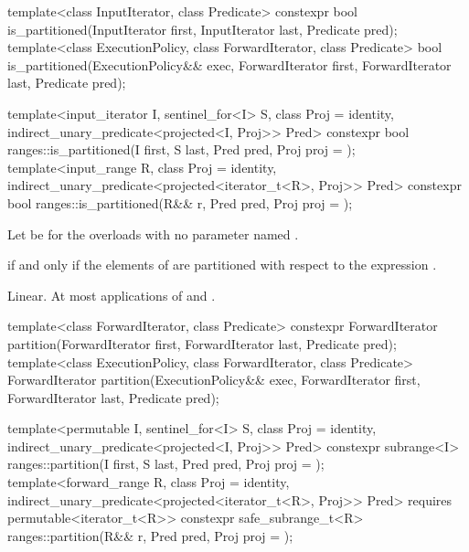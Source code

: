 %
\begin{itemdecl}
template<class InputIterator, class Predicate>
  constexpr bool is_partitioned(InputIterator first, InputIterator last, Predicate pred);
template<class ExecutionPolicy, class ForwardIterator, class Predicate>
  bool is_partitioned(ExecutionPolicy&& exec,
                      ForwardIterator first, ForwardIterator last, Predicate pred);

template<input_iterator I, sentinel_for<I> S, class Proj = identity,
         indirect_unary_predicate<projected<I, Proj>> Pred>
  constexpr bool ranges::is_partitioned(I first, S last, Pred pred, Proj proj = {});
template<input_range R, class Proj = identity,
         indirect_unary_predicate<projected<iterator_t<R>, Proj>> Pred>
  constexpr bool ranges::is_partitioned(R&& r, Pred pred, Proj proj = {});
\end{itemdecl}

\begin{itemdescr}
\pnum
Let  be 
for the overloads with no parameter named .

\pnum
\returns
{} if and only if the elements  of 
are partitioned with respect to the expression
.

\pnum
\complexity
Linear.
At most  applications of  and .
\end{itemdescr}

%
\begin{itemdecl}
template<class ForwardIterator, class Predicate>
  constexpr ForwardIterator
    partition(ForwardIterator first, ForwardIterator last, Predicate pred);
template<class ExecutionPolicy, class ForwardIterator, class Predicate>
  ForwardIterator
    partition(ExecutionPolicy&& exec,
              ForwardIterator first, ForwardIterator last, Predicate pred);

template<permutable I, sentinel_for<I> S, class Proj = identity,
         indirect_unary_predicate<projected<I, Proj>> Pred>
  constexpr subrange<I>
    ranges::partition(I first, S last, Pred pred, Proj proj = {});
template<forward_range R, class Proj = identity,
         indirect_unary_predicate<projected<iterator_t<R>, Proj>> Pred>
  requires permutable<iterator_t<R>>
  constexpr safe_subrange_t<R>
    ranges::partition(R&& r, Pred pred, Proj proj = {});
\end{itemdecl}

